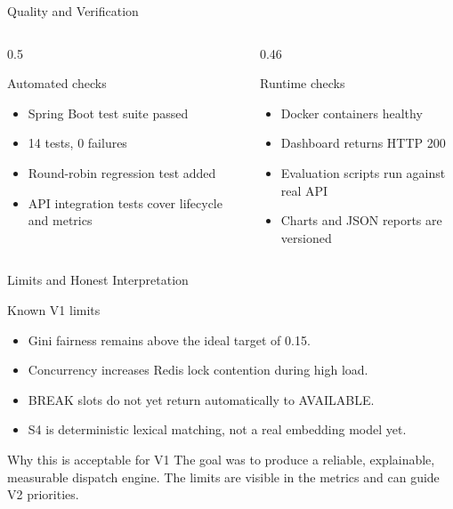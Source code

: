 \documentclass[aspectratio=169,11pt]{beamer}
\begin{document}
\begin{frame}{Quality and Verification}
  \begin{columns}[T]
    \begin{column}{0.5\textwidth}
      \begin{block}{Automated checks}
        \begin{itemize}
          \item Spring Boot test suite passed
          \item 14 tests, 0 failures
          \item Round-robin regression test added
          \item API integration tests cover lifecycle and metrics
        \end{itemize}
      \end{block}
    \end{column}
    \begin{column}{0.46\textwidth}
      \begin{block}{Runtime checks}
        \begin{itemize}
          \item Docker containers healthy
          \item Dashboard returns HTTP 200
          \item Evaluation scripts run against real API
          \item Charts and JSON reports are versioned
        \end{itemize}
      \end{block}
    \end{column}
  \end{columns}
\end{frame}

\begin{frame}{Limits and Honest Interpretation}
  \begin{block}{Known V1 limits}
    \begin{itemize}
      \item Gini fairness remains above the ideal target of 0.15.
      \item Concurrency increases Redis lock contention during high load.
      \item BREAK slots do not yet return automatically to AVAILABLE.
      \item S4 is deterministic lexical matching, not a real embedding model yet.
    \end{itemize}
  \end{block}

  \begin{block}{Why this is acceptable for V1}
    The goal was to produce a reliable, explainable, measurable dispatch engine. The limits are visible in the metrics and can guide V2 priorities.
  \end{block}
\end{frame}
\end{document}
